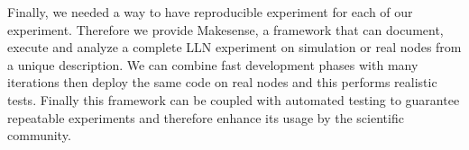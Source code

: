 {Finally, we needed a way to have reproducible experiment for each of our experiment. Therefore we provide Makesense, a framework that can document, execute and analyze a complete \ac{LLN} experiment on simulation or real nodes from a unique description.
We can combine fast development phases with many iterations then deploy the same code on real nodes and this performs realistic tests.
Finally this framework can be coupled with automated testing to guarantee repeatable experiments and therefore enhance its usage by the scientific community.
}

\resumeen

\endgroup

\vfill